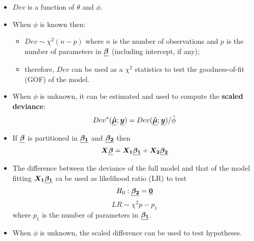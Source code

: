 \begin{frame}
  \begin{itemize}
    \vspace{0.5cm}
    \item $ Dev $ is a function of $ \theta $ and $ \phi $.
    \vspace{0.5cm}
    \item When $ \phi $ is known then:
      \begin{itemize}
        \item $ Dev \sim \chi^2(n-p) $ where $ n $ is the number of observations and $ p $ is the number of parameters in $ \boldsymbol{\underline{\beta}} $ (including intercept, if any);
        \item therefore, $ Dev $ can be used as a $ \chi^2 $ statistics to test the goodness-of-fit (GOF) of the model.
      \end{itemize}
    \vspace{0.5cm}
    \item When $ \phi $ is unknown, it can be estimated and used to compute the \textbf{scaled deviance}:
      $$ Dev^*(\boldsymbol{\underline{\hat{\mu}}};\boldsymbol{\underline{y}}) = Dev(\boldsymbol{\underline{\hat{\mu}}};\boldsymbol{\underline{y}})/\hat{\phi} $$
  \end{itemize}
\end{frame}




\begin{frame}
  \begin{itemize}
    \item If $ \boldsymbol{\underline{\beta}} $ is partitioned in $ \boldsymbol{\underline{\beta_1}} $ and $ \boldsymbol{\underline{\beta_2}} $ then
      $$ \boldsymbol{X}\boldsymbol{\underline{\beta}} = \boldsymbol{X_1}\boldsymbol{\underline{\beta_1}} + \boldsymbol{X_2}\boldsymbol{\underline{\beta_2}} $$
    \vspace{0.25cm}
    \item The difference between the deviance of the full model and that of the model fitting $ \boldsymbol{X_1}\boldsymbol{\underline{\beta_1}} $ ca be used as likelihood ratio (LR) to test
      $$ H_0: \boldsymbol{\underline{\beta_2}} = \boldsymbol{\underline{0}} $$
      $$ LR \sim \chi^2{p-p_1} $$
      where $ p_1 $ is the number of parameters in $ \boldsymbol{\underline{\beta_1}} $.
    \vspace{0.25cm}
    \item When $ \phi $ is unknown, the scaled difference can be used to test hypotheses.
  \end{itemize}
\end{frame}




